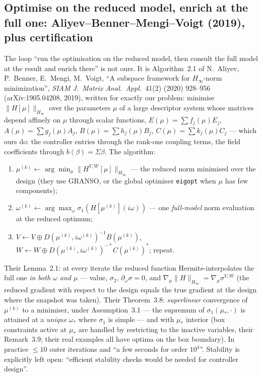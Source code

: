 \documentclass[11pt,a4paper]{article}
\newcommand{\revQ}[1]{{\color{revQ}#1}}
\newcommand{\code}[1]{\texttt{#1}}
\begin{document}
{{\revQ{\subsection{Optimise on the reduced model, enrich at the full one: Aliyev--Benner--Mengi--Voigt (2019), plus certification}
\label{sec:proj-mgmt}
The loop ``run the optimisation on the reduced model, then consult the full model at the
result and enrich there'' is not ours.  It is Algorithm~2.1 of N.~Aliyev, P.~Benner,
E.~Mengi, M.~Voigt, ``A subspace framework for $H_\infty$-norm minimization'',
\emph{SIAM J.\ Matrix Anal.\ Appl.}\ 41(2) (2020) 928--956 (arXiv:1905.04208, 2019),
written for exactly our problem: minimise $\|H[\mu]\|_{H_\infty}$ over the parameters $\mu$
of a large descriptor system whose matrices depend affinely on $\mu$ through scalar
functions, $E(\mu)=\sum f_j(\mu)E_j$, $A(\mu)=\sum g_j(\mu)A_j$, $B(\mu)=\sum h_j(\mu)B_j$,
$C(\mu)=\sum k_j(\mu)C_j$ --- which ours do: the controller entries through the rank-one
coupling terms, the field coefficients through $b(\beta)=\Sigma\beta$.  The algorithm:
\begin{enumerate}[leftmargin=1.8em,itemsep=1pt]
\item $\mu^{(k)}\leftarrow\arg\min_\mu\|H^{V,W}[\mu]\|_{H_\infty}$ --- the reduced norm
minimised over the design (they use GRANSO, or the global optimiser \code{eigopt} when
$\mu$ has few components);
\item $\omega^{(k)}\leftarrow\arg\max_\omega\sigma_1(H[\mu^{(k)}](i\omega))$ --- one
\emph{full-model} norm evaluation at the reduced optimum;
\item $V\leftarrow V\oplus D(\mu^{(k)},i\omega^{(k)})^{-1}B(\mu^{(k)})$,
$W\leftarrow W\oplus D(\mu^{(k)},i\omega^{(k)})^{-\ast}C(\mu^{(k)})^\ast$; repeat.
\end{enumerate}
Their Lemma~2.1: at every iterate the reduced function Hermite-interpolates the full one
\emph{in both $\omega$ and $\mu$} --- value, $\sigma_2$, $\partial_\omega\sigma=0$, and
$\nabla_\mu\|H\|_{H_\infty}=\nabla_\mu\sigma^{V,W}$ (the reduced gradient with respect to
the design equals the true gradient at the design where the snapshot was taken).  Their
Theorem~3.8: \emph{superlinear} convergence of $\mu^{(k)}$ to a minimiser, under
Assumption~3.1 --- the supremum of $\sigma_1(\mu_\ast,\cdot)$ is attained at a \emph{unique}
$\omega_\ast$ where $\sigma_1$ is simple --- and with $\mu_\ast$ interior (box constraints
active at $\mu_\ast$ are handled by restricting to the inactive variables, their
Remark~3.9; their real examples all have optima on the box boundary).  In practice
$\le10$ outer iterations and ``a few seconds for order $10^4$''.  Stability is explicitly
left open: ``efficient stability checks would be needed for controller design''.

}}}
\end{document}
